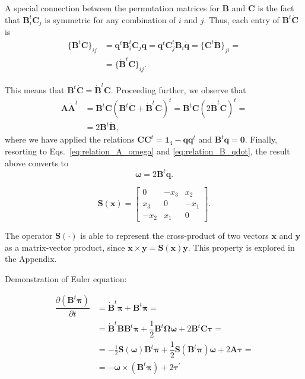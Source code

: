 \documentclass[aip,jcp,reprint,amsmath,amssymb,raggedbottom]{revtex4-1}
\newcommand{\mt}[1]{\boldsymbol{\mathbf{#1}}}           %
\newcommand{\vt}[1]{\boldsymbol{\mathbf{#1}}}           %
\newcommand{\tr}[1]{#1^t}                               %
\newcommand{\diff}[2]{\dfrac{\partial #1}{\partial #2}} %
\begin{document}
A special connection between the permutation matrices for $\mt B$ and $\mt C$ is the fact that $\tr{\mt B_i}{\mt C_j}$ is symmetric for any combination of $i$ and $j$. Thus, each entry of $\tr{\mt B}\dot{\mt C}$ is
\begin{align*}
\{\tr{\mt B}\dot{\mt C}\}_{ij} &= \tr{\vt q}\tr{\mt B}_i{\mt C}_j\dot{\vt q} = \tr{\vt q}\tr{\mt C}_j{\mt B}_i\dot{\vt q} = \{\tr{\mt C}\dot{\mt B}\}_{ji} = \\
&= \{\tr{\dot{\mt B}}\mt C\}_{ij}.
\end{align*}

This means that $\tr{\mt B}\dot{\mt C} = \tr{\dot{\mt B}}{\mt C}$. Proceeding further, we observe that
\begin{align*}
\mt A \tr{\dot{\mt A}} &= \tr{\mt B}\mt C \tr{(\tr{{\mt B}}\dot{\mt C} + \tr{\dot{\mt B}}{\mt C})} = \tr{\mt B}\mt C \tr{(2 \tr{\dot{\mt B}}{\mt C})} = \\
&= 2 \tr{\mt B}\dot{\mt B},
\end{align*}
where we have applied the relations $\mt C \tr{\mt C} = \mt 1_4 - \vt q\tr{\vt q}$ and $\tr{\vt B}\vt q = \vt 0$. Finally, resorting to Eqs.~\ref{eq:relation_A_omega} and \ref{eq:relation_B_qdot}, the result above converts to
\begin{equation}
\vt \omega = 2\tr{\mt B}\dot{\vt q}.
\end{equation}

\begin{equation}
\label{eq:operator_S}
\mt S(\vt x) = \left[ \begin{array}{ccc}
0   & -x_3 &  x_2 \\
x_3 &  0   & -x_1 \\
-x_2 &  x_1 &  0
\end{array}\right].
\end{equation}

The operator  $\mt S(\cdot)$ is able to represent the cross-product of two vectors $\vt x$ and $\vt y$ as a matrix-vector product, since $\vt x \times \vt y = \mt S(\vt x)\vt y$. This property is explored in the Appendix.

Demonstration of Euler equation:

\begin{align*}
\diff{(\tr{\mt B}\vt \pi)}{t} &= \tr{\dot{\mt B}}\vt \pi + \tr{\mt B}\dot{\vt \pi} = \\
&=\tr{\dot{\mt B}}{\mt B}\tr{\mt B}{\vt \pi}  + \dfrac{1}{2} \tr{\mt B}\mt \Omega \vt \omega + 2 \tr{\mt B}\mt C \vt \tau = \\
&= -\frac{1}{2}{\mt S}(\vt \omega)\tr{\mt B}{\vt \pi} + \dfrac{1}{2} {\mt S}(\tr{\mt B}\mt \pi) \vt \omega + 2 \mt A \vt \tau = \\
&= - \vt \omega \times (\tr{\mt B}{\vt \pi}) + 2 {\vt \tau}^\prime
\end{align*}
\end{document}
